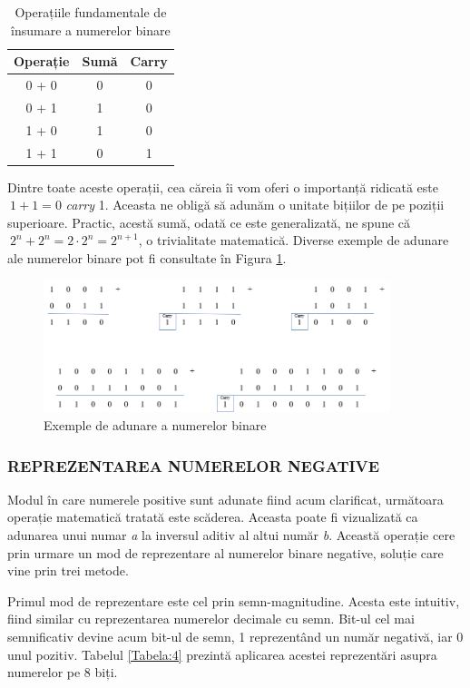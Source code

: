 \documentclass[12pt]{article}
\begin{document}
\begin{table}[h]
\centering
\caption{Operațiile fundamentale de însumare a numerelor binare }
\label{Tabela:3}
\begin{tabular}{ ||c|c|c|| }
 \hline
 Operație & Sumă & Carry \\ 
 \hline  \hline
 0 + 0 & 0 & 0\\
 \hline
 0 + 1 & 1  & 0\\
 \hline
 1 + 0 &  1 & 0 \\
 \hline
 1 + 1 & 0 & 1 \\
 \hline
\end{tabular}
\end{table}
Dintre toate aceste operații, cea căreia îi vom oferi o importanță ridicată este $\ 1 + 1 = 0$ \textit{carry} 1. Aceasta  ne obligă să adunăm o unitate bițiilor de pe poziții superioare. Practic, acestă sumă, odată ce este generalizată, ne spune că $\ 2^n + 2^n = 2 \cdot 2^n = 2^{n+1}$, o trivialitate matematică. Diverse exemple de adunare ale numerelor binare pot fi consultate în Figura \ref{Figura:2}.

 \begin{figure}[h!]
 \centering
 \caption{Exemple de adunare a numerelor binare}
 \label{Figura:2}
 \includegraphics[width=0.9\textwidth]{binary_addition.png}
 \end{figure}

\subsubsection{REPREZENTAREA NUMERELOR NEGATIVE}
Modul în care numerele positive sunt adunate fiind acum clarificat, următoara operație matematică tratată este scăderea. Aceasta poate fi vizualizată ca adunarea unui numar \textit{a} la inversul aditiv al altui număr \textit{b}.
Această operație cere prin urmare un mod de reprezentare al numerelor binare negative, soluție care vine prin trei metode.

Primul mod de reprezentare este cel prin semn-magnitudine. Acesta este intuitiv, fiind similar cu reprezentarea numerelor decimale cu semn. Bit-ul cel mai semnificativ devine acum bit-ul de semn, 1 reprezentând un număr negativă, iar 0 unul pozitiv. Tabelul \ref{Tabela:4} prezintă aplicarea acestei reprezentări asupra numerelor pe 8 biți.
\end{document}
